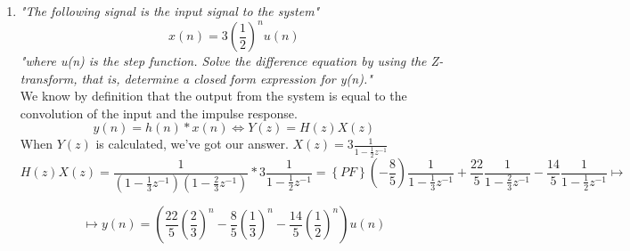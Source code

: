 \documentclass{article}
\begin{document}
\begin{enumerate}
\begin{enumerate}
            \item %
                \emph{"The following signal is the input signal to the system"}
                $$
                    x(n) = 3(\frac{1}{2})^nu(n)
                $$
                \textit{"where u(n) is the step function. Solve the difference equation by using the Z-transform, that is, determine a closed form expression for y(n)."}
                \\
                We know by definition that the output from the system is equal to the
                convolution of the input and the impulse response. 
                $$
                    y(n) = h(n) * x(n) \Longleftrightarrow Y(z) = H(z) X(z)
                $$
                When $Y(z)$ is calculated, we've got our answer. $X(z) = 3\frac{1}{1-\frac{1}{2}z^{-1}}$
                $$
                    H(z) X(z) = \frac{1}{(1-\frac{1}{3}z^{-1})
                    (1-\frac{2}{3}z^{-1})} * 3\frac{1}{1-\frac{1}{2}z^{-1}}
                    = \left\{ PF \right\}
                    \left( -\frac{8}{5}  \right) \frac{1}{1-\frac{1}{3}z^{-1}}
                    + \frac{22}{5} \frac{1}{1-\frac{2}{3}z^{-1}}
                    - \frac{14}{5} \frac{1}{1-\frac{1}{2}z^{-1}} \longmapsto
                $$

                $$
                    \longmapsto 
                    y(n) = 
                    \left(
                        \frac{22}{5}
                        \left(
                            \frac{2}{3}
                        \right)^n
                        -
                        \frac{8}{5}
                        \left(
                            \frac{1}{3}
                        \right)^n
                        -
                        \frac{14}{5}
                        \left(
                            \frac{1}{2}
                        \right)^n
                    \right)
                    u(n)
                $$


\end{enumerate}
\end{enumerate}
\end{document}
